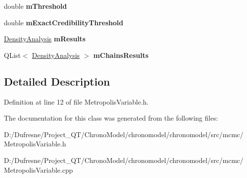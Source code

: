 \begin{DoxyCompactItemize}
\item 
\hypertarget{class_metropolis_variable_ab48b10df7c9b3be156ca07d9221abb7b}{double {\bfseries m\-Threshold}}\label{class_metropolis_variable_ab48b10df7c9b3be156ca07d9221abb7b}

\item 
\hypertarget{class_metropolis_variable_ab9d85fc944745d702bf73c6b569b2a57}{double {\bfseries m\-Exact\-Credibility\-Threshold}}\label{class_metropolis_variable_ab9d85fc944745d702bf73c6b569b2a57}

\item 
\hypertarget{class_metropolis_variable_a5e20e5e6bf17dcc2f15a5fa1782fbaf6}{\hyperlink{struct_density_analysis}{Density\-Analysis} {\bfseries m\-Results}}\label{class_metropolis_variable_a5e20e5e6bf17dcc2f15a5fa1782fbaf6}

\item 
\hypertarget{class_metropolis_variable_a70985ec534c900346313abb0e199750a}{Q\-List$<$ \hyperlink{struct_density_analysis}{Density\-Analysis} $>$ {\bfseries m\-Chains\-Results}}\label{class_metropolis_variable_a70985ec534c900346313abb0e199750a}

\end{DoxyCompactItemize}


\subsection{Detailed Description}


Definition at line 12 of file Metropolis\-Variable.\-h.



The documentation for this class was generated from the following files\-:\begin{DoxyCompactItemize}
\item 
D\-:/\-Dufresne/\-Project\-\_\-\-Q\-T/\-Chrono\-Model/chronomodel/chronomodel/src/mcmc/Metropolis\-Variable.\-h\item 
D\-:/\-Dufresne/\-Project\-\_\-\-Q\-T/\-Chrono\-Model/chronomodel/chronomodel/src/mcmc/Metropolis\-Variable.\-cpp\end{DoxyCompactItemize}
